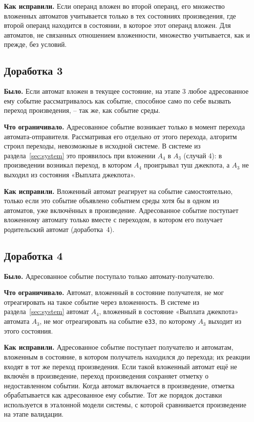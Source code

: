 \documentclass[12pt]{article}
\begin{document}
\textbf{Как исправили.} Если операнд вложен во второй операнд, его
множество вложенных автоматов учитывается только в тех состояниях
произведения, где второй операнд находится в состоянии, в которое этот
операнд вложен. Для автоматов, не связанных отношением вложенности,
множество учитывается, как и прежде, без условий.

\subsection*{Доработка 3}

\textbf{Было.} Если автомат вложен в текущее состояние, на этапе 3 любое
адресованное ему событие рассматривалось как событие, способное само по
себе вызвать переход произведения, -- так же, как событие среды.

\textbf{Что ограничивало.} Адресованное событие возникает только в момент
перехода автомата-отправителя. Рассматривая его отдельно от этого перехода,
алгоритм строил переходы, невозможные в исходной системе. В системе из
раздела~\ref{sec:system} это проявилось при вложении $A_4$ в $A_3$
(случай 4): в произведении возникал переход, в котором $A_4$ проигрывал туш
джекпота, а $A_3$ не выходил из состояния «Выплата джекпота».

\textbf{Как исправили.} Вложенный автомат реагирует на событие
самостоятельно, только если это событие объявлено событием среды хотя бы в
одном из автоматов, уже включённых в произведение. Адресованное событие
поступает вложенному автомату только вместе с переходом, в котором его
получает родительский автомат (доработка~4).

\subsection*{Доработка 4}

\textbf{Было.} Адресованное событие поступало только автомату-получателю.

\textbf{Что ограничивало.} Автомат, вложенный в состояние получателя, не
мог отреагировать на такое событие через вложенность. В системе из
раздела~\ref{sec:system} автомат $A_4$, вложенный в состояние «Выплата
джекпота» автомата $A_3$, не мог отреагировать на событие \texttt{e33},
по которому $A_3$ выходит из этого состояния.

\textbf{Как исправили.} Адресованное событие поступает получателю и
автоматам, вложенным в состояние, в котором получатель находился до
перехода; их реакции входят в тот же переход произведения. Если такой
вложенный автомат ещё не включён в произведение, переход произведения
сохраняет отметку о недоставленном событии. Когда автомат включается в
произведение, отметка обрабатывается как адресованное ему событие. Тот же
порядок доставки используется в эталонной модели системы, с которой
сравнивается произведение на этапе валидации.
\end{document}
